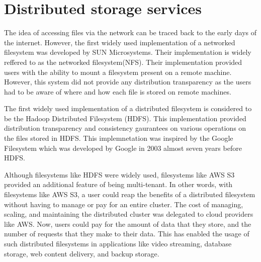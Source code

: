 \section{Distributed storage services}\label{sec:distributedStorage}
The idea of accessing files via the network can be traced back to the early days
of the internet. However, the first widely used implementation of a networked
filesystem was developed by SUN Microsystems\cite{nfs1986}. Their implementation
is widely reffered to as the networked filesystem(NFS). Their implementation
provided users with the ability to mount a filesystem present on a remote
machine. However, this system did not provide any distribution transparency as
the users had to be aware of where and how each file is stored on remote
machines. 

\medskip
The first widely used implementation of a distributed filesystem is considered
to be the Hadoop Distributed Filesystem (HDFS)\cite{shvachko2010hadoop}. This
implementation provided distribution transparency and consistency gaurantees on
various operations on the files stored in HDFS. This implemnetation was inspired
by the Google Filesystem\cite{ghemawat2003google} which was developed by Google
in 2003 almost seven years before HDFS.

\medskip
Although filesystems like HDFS were widely used, filesystems like AWS
S3\cite{awsS3} provided an additional feature of being multi-tenant. In other
words, with filesystems like AWS S3, a user could reap the benefits of a
distributed filesystem without having to manage or pay for an entire cluster.
The cost of managing, scaling, and maintaining the distributed cluster was
delegated to cloud providers like AWS. Now, users could pay for the amount of
data that they store, and the number of requests that they make to their data.
This has enabled the usage of such distributed filesystems in applications like
video streaming, database storage\cite{snowflake}, web content 
delivery, and backup storage.

